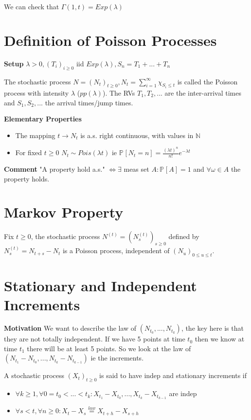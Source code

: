 We can check that $\Gamma(1,t)=Exp(\lambda)$

\section{Definition of Poisson Processes}
\textbf{Setup}  $\lambda > 0, (T_i)_{i\geq 0}$ iid $Exp(\lambda ), S_n = T_1+...+T_n$

\begin{defn}
	The stochastic process $N=(N_t)_{t\geq 0}, N_t = \sum_{i=1}^{\infty} \chi_{S_i \leq t}$ is called the Poisson process with intensity $\lambda $ ($pp(\lambda)$). The RVs  $T_1,T_2,...$ are the inter-arrival times and  $S_1,S_2,...$ the arrival times/jump times.
\end{defn}
\noindent
\textbf{Elementary Properties}
\begin{itemize}
	\item The mapping $t \to N_t$ is a.s. right continuous, with values in $\mathbb{N}$
	\item For fixed $t\geq 0$ $N_t \sim Pois(\lambda t)$ ie $\mathbb{P}_{} \left[ N_t = n \right] = \frac{(\lambda t)^n}{n!}e^{- \lambda  t}$
\end{itemize}

\noindent
\textbf{Comment} "A property hold a.s." $\iff \exists$ meas set $A: \mathbb{P}_{} \left[ A \right] =1$ and $\forall \omega \in A$ the property holds. 


\section{Markov Property}
\begin{theorem}
	Fix $t\geq 0$, the stochastic process $N^{(t)}=(N^{(t)}_{s})_{s \geq 0}$ defined by $N^{(t)}_s = N_{t+s}-N_{t}$ is a Poisson process, independent of $(N_u)_{0 \leq u \leq t}$.
\end{theorem}

\section{Stationary and Independent Increments}
\textbf{Motivation} We want to describe the law of $(N_{t_0},...,N_{t_k})$, the key here is that they are not totally independent. If we have 5 points at time $t_0$ then we know at time $t_1$ there will be at least 5 points. So we look at the law of $(N_{t_1}-N_{t_0},...,N_{t_k}-N_{t_{k-1}})$ ie the increments.

\begin{defn}
	A stochastic process $(X_t)_{t\geq 0}$ is said to have indep and stationary increments if 
\begin{itemize}
	\item $\forall k \geq 1, \forall 0=t_0 < ... < t_k: X_{t_1}-X_{t_0}, ..., X_{t_k}- X _{t_{k-1}}$ are indep
	\item $\forall  s<t, \forall  n \geq 0: X_t - X_s \stackrel{law}{=} X _{t+h}-X_{s+h}$
\end{itemize}

\end{defn}

